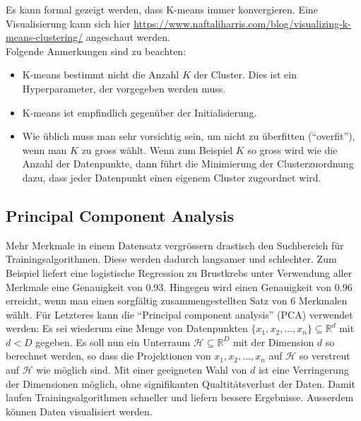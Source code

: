 Es kann formal gezeigt werden, dass K-means immer konvergieren. Eine Visualisierung kann sich hier \url{https://www.naftaliharris.com/blog/visualizing-k-means-clustering/} angeschaut werden.\\[0.3cm]
Folgende Anmerkungen sind zu beachten:
\begin{itemize}
    \setlength\itemsep{0em}
        \item K-means bestimmt nicht die Anzahl $K$ der Cluster. Dies ist ein Hyperparameter, der vorgegeben werden muss.
        \item K-means ist empfindlich gegenüber der Initialisierung.
        \item Wie üblich muss man sehr vorsichtig sein, um nicht zu überfitten (``overfit''), wenn man $K$ zu gross w\"ahlt.  Wenn zum Beispiel $K$ so gross wird wie die Anzahl der Datenpunkte, dann f\"uhrt die Minimierung der Clusterzuordnung dazu, dass jeder Datenpunkt einen eigenem Cluster zugeordnet wird. %
\end{itemize}


\subsection{Principal Component Analysis}
\label{subsec:vl13-2}

Mehr Merkmale in einem Datensatz vergr\"ossern drastisch den Suchbereich f\"ur Trainingsalgorithmen. Diese werden dadurch langsamer und schlechter. Zum Beispiel liefert eine logistische Regression zu Brustkrebs unter Verwendung aller Merkmale eine Genauigkeit von 0.93. Hingegen wird einen Genauigkeit von 0.96 erreicht, wenn man einen sorgfältig zusammengestellten Satz von 6 Merkmalen w\"ahlt. F\"ur Letzteres kann die ``Principal component analysis'' (PCA) verwendet werden: Es sei wiederum eine Menge von Datenpunkten $\{ x_1, x_2, ..., x_n\} \subseteq \mathbb{R}^d$ mit $d < D$ gegeben. Es soll nun ein Unterraum $\mathcal{H} \subseteq \mathbb{R}^D$ mit der Dimension $d$ so berechnet werden, so dass die Projektionen von $x_1, x_2, \ldots, x_n$ auf $\mathcal{H}$ so verstreut auf $\mathcal{H}$ wie m\"oglich sind. Mit einer geeigneten Wahl von $d$ ist eine Verringerung der Dimensionen m\"oglich, ohne signifikanten Qualtit\"atsverlust der Daten. Damit laufen Trainingsalgorithmen schneller und liefern bessere Ergebnisse. Ausserdem k\"onnen Daten visualisiert werden.


